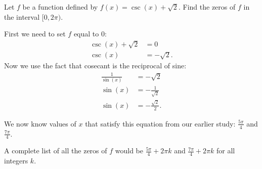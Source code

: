 \documentclass{ximera}
\begin{document}
\begin{example}
Let $f$ be a function defined by $f(x)=\csc(x) + \sqrt{2}$. Find the zeros of $f$ in the interval $[0, 2\pi)$.
\begin{explanation}
First we need to set $f$ equal to $0$:
\begin{align*}
\csc(x) + \sqrt{2} & = 0 \\
\csc(x) & = -\sqrt{2}.
\end{align*}
Now we use the fact that cosecant is the reciprocal of sine:
\begin{align*}
\frac{1}{\sin(x)} & = -\sqrt{2} \\
\sin(x) & = -\frac{1}{\sqrt{2}} \\
\sin(x) & = -\frac{\sqrt{2}}{2}.
\end{align*}

We now know values of $x$ that satisfy this equation from our earlier study: $\frac{5\pi}{4}$ and $\frac{7\pi}{4}$. 

A complete list of all the zeros of $f$ would be $\frac{5\pi}{4} + 2\pi k$ and $\frac{7\pi}{4} + 2\pi k$ for all integers $k$. 
\end{explanation}
\end{example}
\end{document}
